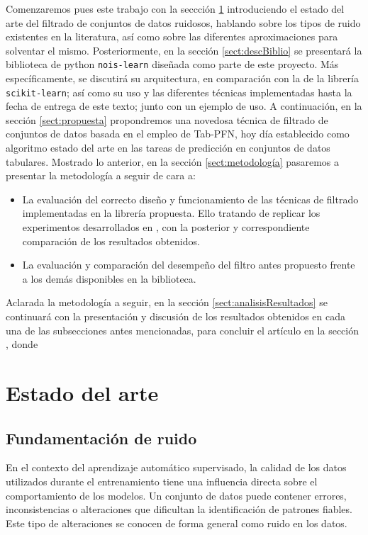 \documentclass[print, color]{ugrTFG}
\begin{document}
Comenzaremos pues este trabajo con la seccción \ref{sect:SOTA} introduciendo el estado del arte del filtrado de conjuntos de datos ruidosos, hablando sobre los tipos de ruido existentes en la literatura, así como sobre las diferentes aproximaciones para solventar el mismo. Posteriormente, en la sección \ref{sect:descBiblio} se presentará la biblioteca de python \texttt{nois-learn} diseñada como parte de este proyecto. Más específicamente, se discutirá su arquitectura, en comparación con la de la librería \texttt{scikit-learn}; así como su uso y las diferentes técnicas implementadas hasta la fecha de entrega de este texto; junto con un ejemplo de uso. A continuación, en la sección \ref{sect:propuesta} propondremos una novedosa técnica de filtrado de conjuntos de datos basada en el empleo de Tab-PFN\cite{hollmann2023tabpfntransformersolvessmall}, hoy día establecido como algoritmo estado del arte en las tareas de predicción en conjuntos de datos tabulares. Mostrado lo anterior, en la sección \ref{sect:metodología} pasaremos a presentar la metodología a seguir de cara a:
\begin{itemize}
    \item La evaluación del correcto diseño y funcionamiento de las técnicas de filtrado implementadas en la librería propuesta. Ello tratando de replicar los experimentos desarrollados en \cite{LUENGO201827}, con la posterior y correspondiente comparación de los resultados obtenidos.

    \item La evaluación y comparación del desempeño del filtro antes propuesto frente a los demás disponibles en la biblioteca.
\end{itemize}

Aclarada la metodología a seguir, en la sección \ref{sect:analisisResultados} se continuará con la presentación  y discusión de los resultados obtenidos en cada una de las subsecciones antes mencionadas, para concluir el artículo en la sección \label{sect:conclusiones}, donde  

\chapter{Estado del arte}\label{sect:SOTA}

\section{Fundamentación de ruido}

En el contexto del aprendizaje automático supervisado, la calidad de los datos utilizados durante el entrenamiento tiene una influencia directa sobre el comportamiento de los modelos. Un conjunto de datos puede contener errores, inconsistencias o alteraciones que dificultan la identificación de patrones fiables. Este tipo de alteraciones se conocen de forma general como ruido en los datos.
\end{document}
